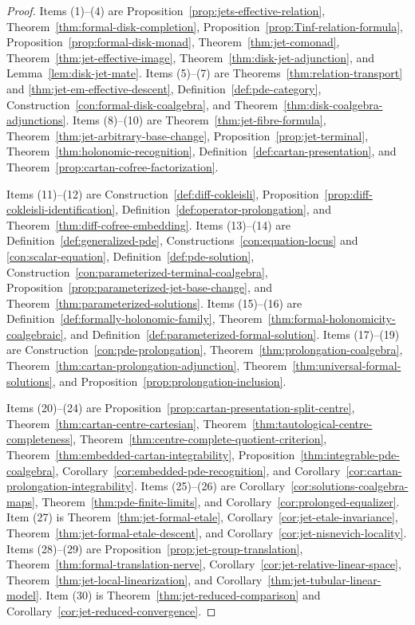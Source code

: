 \begin{proof}
Items (1)--(4) are Proposition~\ref{prop:jets-effective-relation}, Theorem~\ref{thm:formal-disk-completion}, Proposition~\ref{prop:Tinf-relation-formula}, Proposition~\ref{prop:formal-disk-monad}, Theorem~\ref{thm:jet-comonad}, Theorem~\ref{thm:jet-effective-image}, Theorem~\ref{thm:disk-jet-adjunction}, and Lemma~\ref{lem:disk-jet-mate}.  Items (5)--(7) are Theorems~\ref{thm:relation-transport} and \ref{thm:jet-em-effective-descent}, Definition~\ref{def:pde-category}, Construction~\ref{con:formal-disk-coalgebra}, and Theorem~\ref{thm:disk-coalgebra-adjunctions}.  Items (8)--(10) are Theorem~\ref{thm:jet-fibre-formula}, Theorem~\ref{thm:jet-arbitrary-base-change}, Proposition~\ref{prop:jet-terminal}, Theorem~\ref{thm:holonomic-recognition}, Definition~\ref{def:cartan-presentation}, and Theorem~\ref{prop:cartan-cofree-factorization}.

Items (11)--(12) are Construction~\ref{def:diff-cokleisli}, Proposition~\ref{prop:diff-cokleisli-identification}, Definition~\ref{def:operator-prolongation}, and Theorem~\ref{thm:diff-cofree-embedding}.  Items (13)--(14) are Definition~\ref{def:generalized-pde}, Constructions~\ref{con:equation-locus} and \ref{con:scalar-equation}, Definition~\ref{def:pde-solution}, Construction~\ref{con:parameterized-terminal-coalgebra}, Proposition~\ref{prop:parameterized-jet-base-change}, and Theorem~\ref{thm:parameterized-solutions}.  Items (15)--(16) are Definition~\ref{def:formally-holonomic-family}, Theorem~\ref{thm:formal-holonomicity-coalgebraic}, and Definition~\ref{def:parameterized-formal-solution}.  Items (17)--(19) are Construction~\ref{con:pde-prolongation}, Theorem~\ref{thm:prolongation-coalgebra}, Theorem~\ref{thm:cartan-prolongation-adjunction}, Theorem~\ref{thm:universal-formal-solutions}, and Proposition~\ref{prop:prolongation-inclusion}.

Items (20)--(24) are Proposition~\ref{prop:cartan-presentation-split-centre}, Theorem~\ref{thm:cartan-centre-cartesian}, Theorem~\ref{thm:tautological-centre-completeness}, Theorem~\ref{thm:centre-complete-quotient-criterion}, Theorem~\ref{thm:embedded-cartan-integrability}, Proposition~\ref{thm:integrable-pde-coalgebra}, Corollary~\ref{cor:embedded-pde-recognition}, and Corollary~\ref{cor:cartan-prolongation-integrability}.  Items (25)--(26) are Corollary~\ref{cor:solutions-coalgebra-maps}, Theorem~\ref{thm:pde-finite-limits}, and Corollary~\ref{cor:prolonged-equalizer}.  Item (27) is Theorem~\ref{thm:jet-formal-etale}, Corollary~\ref{cor:jet-etale-invariance}, Theorem~\ref{thm:jet-formal-etale-descent}, and Corollary~\ref{cor:jet-nisnevich-locality}.  Items (28)--(29) are Proposition~\ref{prop:jet-group-translation}, Theorem~\ref{thm:formal-translation-nerve}, Corollary~\ref{cor:jet-relative-linear-space}, Theorem~\ref{thm:jet-local-linearization}, and Corollary~\ref{thm:jet-tubular-linear-model}.  Item (30) is Theorem~\ref{thm:jet-reduced-comparison} and Corollary~\ref{cor:jet-reduced-convergence}.


\end{proof}
